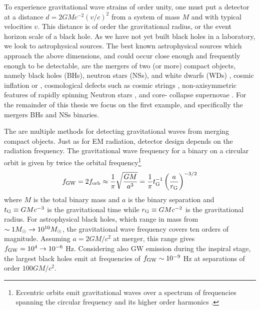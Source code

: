 To experience gravitational wave strains of order unity, one must put a
detector at a distance $d= 2GMc^{-2} (v/c)^2$ from a system of mass $M$ and
with typical velocities $v$. This distance is of order the gravitational
radius, or the event horizon scale of a black hole. As we have not yet built
black holes in a laboratory, we look to astrophysical sources. The best known
astrophysical sources which approach the above dimensions, and could occur
close enough and frequently enough to be detectable, are the mergers of two
(or more) compact objects, namely black holes (BHs), neutron stars (NSs), and
white dwarfs (WDs) \citep[\emph{e.g.}][]{ThorneBraginsky:1976,
ClarkeErdley:1977, Belczynski:2016}, cosmic inflation \citep{Starobinski:1979}
or \citep[\emph{e.g.}][for a recent review]{Guzzetti:2016}, cosmological
defects such as cosmic strings \citep[\emph{e.g.}][and references
therein]{Damour:2005},  non-axisymmetric features of rapidly spinning Neutron
stars \citep[\emph{e.g.}][and refernces therein]{Haskell:2015}, and core-
collapse supernovae \citep[\emph{e.g.}][and references therein]{FryerNew:2003:LRR}.  For the remainder of this thesis we focus on the
first example, and specifically  the mergers BHs and NSs binaries.

The are multiple methods for detecting gravitational waves from merging
compact objects. Just as for EM radiation, detector design depends on the
radiation frequency. The gravitational wave frequency for a binary on a
circular orbit is given by twice the orbital frequency\footnote{Eccentric
orbits emit gravitational waves over a spectrum of frequencies spanning the
circular frequency and its higher order harmonics \citep[\emph{e.g.}][]{Enoki:2007}.} 
\begin{equation}
f_{\rm{GW}} = 2 f_{\rm{orb}} \approx  \frac{1}{\pi} \sqrt{\frac{G M }{a^3}} =
\frac{1}{\pi} t^{-1}_{\rm{G}} \left( \frac{a}{r_{\rm{G}}} \right)^{-3/2}
\label{Eq:GWfreq}
\end{equation} 
where $M$ is the total binary mass and $a$ is the binary
separation and $t_{\rm{G}} \equiv GMc^{-3}$ is the gravitational time while
$r_{\rm{G}} \equiv GMc^{-2}$ is the gravitational radius.  For astrophysical
black holes, which range in mass from $\sim 1 {M_{\odot}} \rightarrow 10^{10}
{M_{\odot}}$, the gravitational wave frequency covers ten orders of magnitude.
Assuming $a = 2GM/c^2$ at merger, this range gives $f_{\rm{GW}} = 10^4 \rightarrow
10^{-6}$ Hz. Considering also GW emission during the inspiral stage, the
largest black holes emit at frequencies of $f_{\rm{GW}} \sim 10^{-9}$ Hz at
separations of order $100 GM/c^2$.

